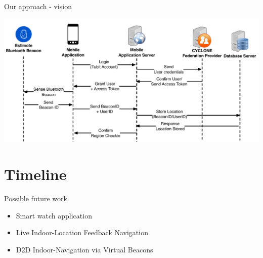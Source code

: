 \documentclass[11pt]{beamer}
\begin{document}
\begin{frame}{Our approach - vision}

    \begin{center}

        \includegraphics[width=\textwidth]{sequencediagram_sharelocation_extended}
    
    \end{center}

\end{frame}

\section{Timeline}

\begin{frame}{Possible future work}

	\begin{itemize}
        \item Smart watch application
        \item Live Indoor-Location Feedback Navigation
        \item D2D Indoor-Navigation via Virtual Beacons
    \end{itemize}

\end{frame}
\end{document}
